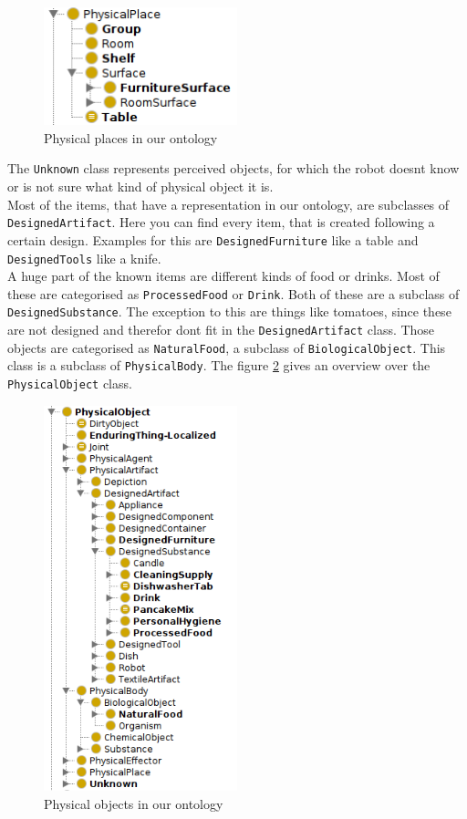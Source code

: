 \documentclass[main.tex]{subfiles}
\begin{document}
\begin{figure}
\centering
\includegraphics[width=0.5\textwidth]{pictures/ontology/Ontologie_place.png}
\caption{Physical places in our ontology}
\label{fig:place_ont}
\end{figure}

The \texttt{Unknown} class represents perceived objects, for which the robot doesnt know or is not sure what kind of physical object it is.\\
Most of the items, that have a representation in our ontology, are subclasses of \texttt{DesignedArtifact}.
Here you can find every item, that is created following a certain design. 
Examples for this are \texttt{DesignedFurniture} like a table and \texttt{DesignedTools} like a knife.\\
A huge part of the known items are different kinds of food or drinks. Most of these are categorised as \texttt{ProcessedFood} or \texttt{Drink}. Both of these are a subclass of \texttt{DesignedSubstance}. The exception to this are things like tomatoes, since these are not designed and therefor dont fit in the \texttt{DesignedArtifact} class. Those objects are categorised as \texttt{NaturalFood}, a subclass of \texttt{BiologicalObject}. This class is a subclass of \texttt{PhysicalBody}. The figure \ref{fig:object_ont} gives an overview over the \texttt{PhysicalObject} class.

\begin{figure}
\centering
\includegraphics[width=0.5\textwidth]{pictures/ontology/Ontologie_objects.png}
\caption{Physical objects in our ontology}
\label{fig:object_ont}
\end{figure}
\end{document}
